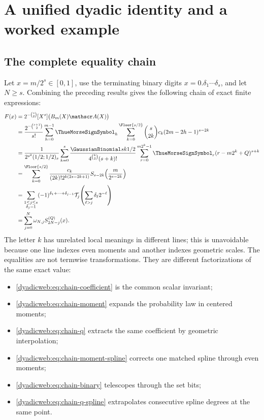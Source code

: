 \documentclass[11pt,oneside]{article}
\theoremstyle{definition}
\theoremstyle{remark}
\begin{document}
\section{A unified dyadic identity and a worked example}
\label{dyadicweb:sec:worked}

\subsection{The complete equality chain}

Let $x=m/2^s\in[0,1]$, use the terminating binary digits
$x=0.\delta_1\cdots\delta_s$, and let $N\ge s$.  Combining the preceding results gives the
following chain of exact finite expressions:
\begin{align}
 F(x)
 &=2^{-\binom s2}[X^s]\bigl(B_m(X)\mathscr A(X)\bigr)     \label{dyadicweb:eq:chain-coefficient}\\
 &=\frac{2^{-\binom{s+1}{2}}}{s!}
   \sum_{h=0}^{m-1}\ThueMorseSignSymbol_h
   \sum_{k=0}^{\Floor{s/2}}
   \binom s{2k}c_k(2m-2h-1)^{s-2k}                       \label{dyadicweb:eq:chain-moment}\\
 &=\frac{1}{2^{s^2}(1/2;1/2)_s}
   \sum_{k=0}^{s}\frac{\GaussianBinomial sk{1/2}}{4^{\binom k2}(s+k)!}
   \sum_{r=0}^{m2^k-1}\ThueMorseSignSymbol_r(r-m2^k+Q)^{s+k}              \label{dyadicweb:eq:chain-q}\\
 &=\sum_{k=0}^{\Floor{s/2}}
   \frac{c_k}{(2k)!2^{k(2s-2k+1)}}
   S_{s-2k}\!\left(\frac{m}{2^{s-2k}}\right)             \label{dyadicweb:eq:chain-moment-spline}\\
 &=\sum_{\substack{1\le j\le s\\\delta_j=1}}
   (-1)^{\delta_1+\cdots+\delta_{j-1}}
   \mathcal T_j\!\left(\sum_{\ell>j}\delta_\ell2^{-\ell}\right) \label{dyadicweb:eq:chain-binary}\\
 &=\sum_{j=0}^{N}\omega_{N,j}S_{2N-j}^{(Q)}(x).           \label{dyadicweb:eq:chain-q-spline}
\end{align}
The letter $k$ has unrelated local meanings in different lines; this is unavoidable because
one line indexes even moments and another indexes geometric scales.  The equalities are not
termwise transformations.  They are different factorizations of the same exact value:
\begin{itemize}
\item \eqref{dyadicweb:eq:chain-coefficient} is the common scalar invariant;
\item \eqref{dyadicweb:eq:chain-moment} expands the probability law in centered moments;
\item \eqref{dyadicweb:eq:chain-q} extracts the same coefficient by geometric interpolation;
\item \eqref{dyadicweb:eq:chain-moment-spline} corrects one matched spline through even moments;
\item \eqref{dyadicweb:eq:chain-binary} telescopes through the set bits;
\item \eqref{dyadicweb:eq:chain-q-spline} extrapolates consecutive spline degrees at the same point.
\end{itemize}
\end{document}
